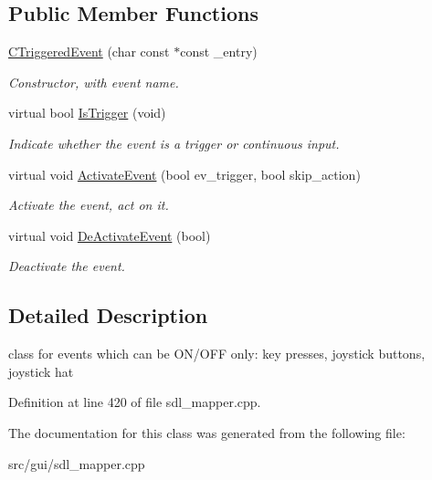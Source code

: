 \subsection*{Public Member Functions}
\begin{DoxyCompactItemize}
\item 
\hypertarget{classCTriggeredEvent_ac9f3fc82121e3632950dfd89e37fc90d}{\hyperlink{classCTriggeredEvent_ac9f3fc82121e3632950dfd89e37fc90d}{C\-Triggered\-Event} (char const $\ast$const \-\_\-entry)}\label{classCTriggeredEvent_ac9f3fc82121e3632950dfd89e37fc90d}

\begin{DoxyCompactList}\small\item\em Constructor, with event name. \end{DoxyCompactList}\item 
\hypertarget{classCTriggeredEvent_a4ab6cb9bc929db0b4281218ff1205cb6}{virtual bool \hyperlink{classCTriggeredEvent_a4ab6cb9bc929db0b4281218ff1205cb6}{Is\-Trigger} (void)}\label{classCTriggeredEvent_a4ab6cb9bc929db0b4281218ff1205cb6}

\begin{DoxyCompactList}\small\item\em Indicate whether the event is a trigger or continuous input. \end{DoxyCompactList}\item 
\hypertarget{classCTriggeredEvent_a29ccd4723c9cc4e779601a4330f346a3}{virtual void \hyperlink{classCTriggeredEvent_a29ccd4723c9cc4e779601a4330f346a3}{Activate\-Event} (bool ev\-\_\-trigger, bool skip\-\_\-action)}\label{classCTriggeredEvent_a29ccd4723c9cc4e779601a4330f346a3}

\begin{DoxyCompactList}\small\item\em Activate the event, act on it. \end{DoxyCompactList}\item 
\hypertarget{classCTriggeredEvent_a8ae31a06642b3e4c37e8760194fd7607}{virtual void \hyperlink{classCTriggeredEvent_a8ae31a06642b3e4c37e8760194fd7607}{De\-Activate\-Event} (bool)}\label{classCTriggeredEvent_a8ae31a06642b3e4c37e8760194fd7607}

\begin{DoxyCompactList}\small\item\em Deactivate the event. \end{DoxyCompactList}\end{DoxyCompactItemize}


\subsection{Detailed Description}
class for events which can be O\-N/\-O\-F\-F only\-: key presses, joystick buttons, joystick hat 

Definition at line 420 of file sdl\-\_\-mapper.\-cpp.



The documentation for this class was generated from the following file\-:\begin{DoxyCompactItemize}
\item 
src/gui/sdl\-\_\-mapper.\-cpp\end{DoxyCompactItemize}

